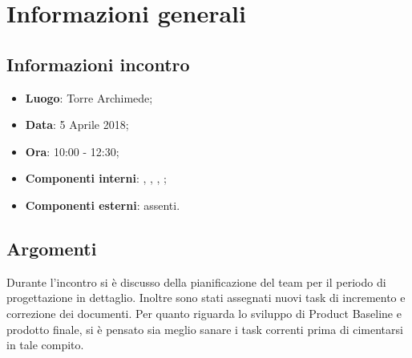 \section{Informazioni generali}
\subsection{Informazioni incontro}
\begin{itemize}
\item \textbf{Luogo}: Torre Archimede;
\item \textbf{Data}: 5 Aprile 2018;
\item \textbf{Ora}: 10:00 - 12:30;
\item \textbf{Componenti interni}: \Tommaso, \Mattia, \Luca, \Isacco;
\item \textbf{Componenti esterni}: assenti.
\end{itemize}

\subsection{Argomenti}
Durante l'incontro si è discusso della pianificazione del team per il periodo di progettazione in dettaglio. Inoltre sono stati assegnati nuovi task di incremento e correzione dei documenti. Per quanto riguarda lo sviluppo di Product Baseline e prodotto finale, si è pensato sia meglio sanare i task correnti prima di cimentarsi in tale compito.

